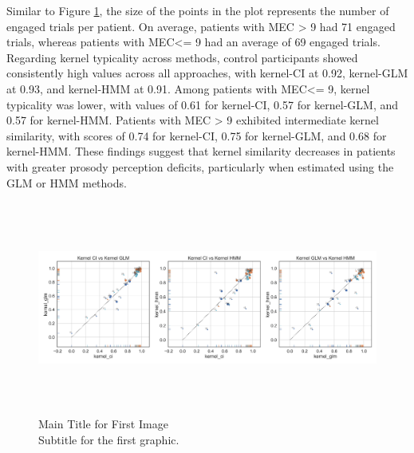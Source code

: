 Similar to Figure \ref{fig:kernel_comparison_methods}, the size of the points in the plot represents the number of engaged trials per patient. On average, patients with MEC > 9 had 71 engaged trials, whereas patients with MEC<= 9 had an average of 69 engaged trials.
Regarding kernel typicality across methods, control participants showed consistently high values across all approaches, with kernel-CI at 0.92, kernel-GLM at 0.93, and kernel-HMM at 0.91. Among patients with MEC<= 9, kernel typicality was lower, with values of 0.61 for kernel-CI, 0.57 for kernel-GLM, and 0.57 for kernel-HMM. Patients with MEC > 9 exhibited intermediate kernel similarity, with scores of 0.74 for kernel-CI, 0.75 for kernel-GLM, and 0.68 for kernel-HMM. These findings suggest that kernel similarity decreases in patients with greater prosody perception deficits, particularly when estimated using the GLM or HMM methods.
\begin{figure}[H]
    \centering
    \includegraphics[width=17cm,height=7cm]{MainLayout/Images/chapter8/kernel_comparison_types_methods.jpg}
    \caption{Main Title for First Image \\ \small Subtitle for the first graphic.}
    \label{fig:kernel_comparison_methods}
\end{figure}

